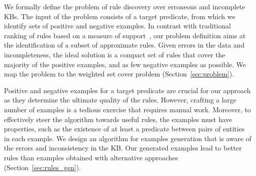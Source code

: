 \vspace{0.5ex}
We formally define the problem of rule discovery over erroneous and incomplete KBs. The input of the problem consists of a target predicate, from which we identify sets of positive and negative examples.  In contrast with traditional ranking of rules based on a measure of support~\cite{dehaspe1999discovery,galarraga2015fast,schoenmackers2010learning}, our  problem definition aims at the identification of a subset of approximate rules. %
Given errors in the data and incompleteness, the ideal solution is a compact set of rules that cover the majority of the positive examples, and as few negative examples as possible. We map the problem to the %
weighted set cover problem (Section~\ref{sec:problem}).




\vspace{0.5ex}
Positive and negative examples for a target predicate are crucial for our approach as they determine the ultimate quality of the rules. However, crafting a large number of examples is a tedious exercise that requires manual work. Moreover, to effectively steer the algorithm towards useful rules, the examples must have properties, such as the existence of at least a predicate between pairs of entities in each example. We design an algorithm for examples generation that is aware of the errors and inconsistency in the KB. Our generated examples lead to better rules than examples obtained with alternative approaches (Section~\ref{sec:rules_gen}). %


